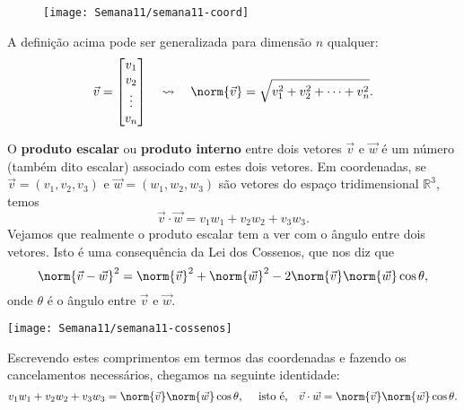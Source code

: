 \begin{figure}[h!]
	\begin{center}
		\texttt{[image: Semana11/semana11-coord]}
	\end{center}
\end{figure}

\noindent A definição acima pode ser generalizada para dimensão $n$ qualquer:
\begin{equation}
\vec{v} =
\begin{bmatrix}
v_1 \\ v_2 \\ \vdots \\ v_n
\end{bmatrix} \quad \rightsquigarrow \quad \norm{\vec{v}} = \sqrt{v_1^2 + v_2^2 + \cdots + v_n^2}.
\end{equation}


O \textbf{produto escalar} ou \textbf{produto interno} entre dois vetores $\vec{v}$ e $\vec{w}$ é um número (também dito escalar) associado com estes dois vetores. Em coordenadas, se $\vec{v} = (v_1, v_2, v_3)$ e $\vec{w} = (w_1, w_2, w_3)$ são vetores do espaço tridimensional $\mathbb{R}^3$, temos
\begin{equation}
\vec{v} \cdot \vec{w} = v_1 w_1 + v_2 w_2 + v_3 w_3.
\end{equation} Vejamos que realmente o produto escalar tem a ver com o ângulo entre dois vetores. Isto é uma consequência da Lei dos Cossenos, que nos diz que
\begin{equation}
\norm{\vec{v} - \vec{w}}^2 = \norm{\vec{v}}^2 + \norm{\vec{w}}^2 - 2 \norm{\vec{v}} \norm{\vec{w}} \cos \theta,
\end{equation} onde $\theta$ é o ângulo entre $\vec{v}$ e $\vec{w}$.

	\begin{center}
		\texttt{[image: Semana11/semana11-cossenos]}
	\end{center}

\noindent Escrevendo estes comprimentos em termos das coordenadas e fazendo os cancelamentos necessários, chegamos na seguinte identidade:
\begin{equation}
v_1 w_1 + v_2 w_2 + v_3 w_3 = \norm{\vec{v}} \norm{\vec{w}} \cos \theta, \quad \text{ isto é,} \quad \vec{v} \cdot \vec{w} = \norm{\vec{v}} \norm{\vec{w}} \cos \theta.
\end{equation}


